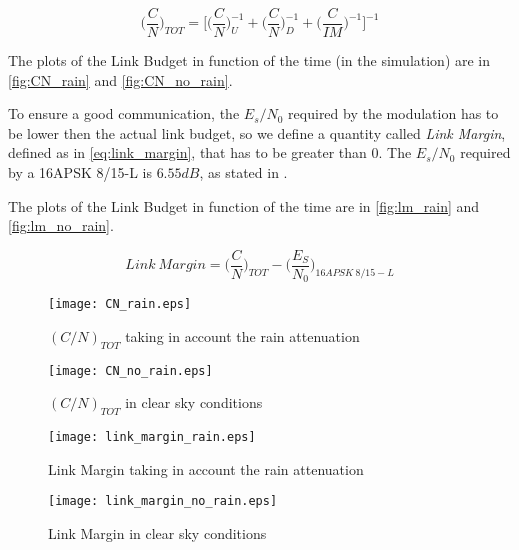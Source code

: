 \begin{equation}\label{eq:link_budget_formula}
	\bigg(\frac{C}{N}\bigg)_{TOT} = \bigg[\bigg(\frac{C}{N}\bigg)^{-1}_U + \bigg(\frac{C}{N}\bigg)^{-1}_D + \bigg(\frac{C}{IM}\bigg)^{-1}\bigg]^{-1}
\end{equation}

The plots of the Link Budget in function of the time (in the simulation) are in	\autoref{fig:CN_rain} and \autoref{fig:CN_no_rain}.

To ensure a good communication, the $E_s/N_0$ required by the modulation has to be lower then the actual link budget, so we define a quantity called \textit{Link Margin}, defined as in \autoref{eq:link_margin}, that has to be greater than 0. The $E_s/N_0$ required by a 16APSK 8/15-L is $6.55dB$, as stated in \cite{dvbs2x}.

The plots of the Link Budget in function of the time are in	\autoref{fig:lm_rain} and \autoref{fig:lm_no_rain}.

\begin{equation}\label{eq:link_margin}
	Link ~Margin = \bigg(\frac{C}{N}\bigg)_{TOT} - \bigg(\frac{E_S}{N_0}\bigg)_{16APSK ~8/15-L}
\end{equation}

\begin{figure}[ht]
	\begin{minipage}{.5\textwidth}
		\centering
		\texttt{[image: CN\_rain.eps]}
		\caption{$(C/N)_{TOT}$ taking in account the rain attenuation}
		\label{fig:CN_rain}
	\end{minipage}\hspace{0.5cm}
	\begin{minipage}{.5\textwidth}
		\centering
		\texttt{[image: CN\_no\_rain.eps]}
		\caption{$(C/N)_{TOT}$ in clear sky conditions}
		\label{fig:CN_no_rain}
	\end{minipage}
\end{figure}

\begin{figure}[ht]
	\begin{minipage}{.5\textwidth}
		\centering
		\texttt{[image: link\_margin\_rain.eps]}
		\caption{Link Margin taking in account the rain attenuation}
		\label{fig:lm_rain}
	\end{minipage}\hspace{0.5cm}
	\begin{minipage}{.5\textwidth}
		\centering
		\texttt{[image: link\_margin\_no\_rain.eps]}
		\caption{Link Margin in clear sky conditions}
		\label{fig:lm_no_rain}
	\end{minipage}
\end{figure}
